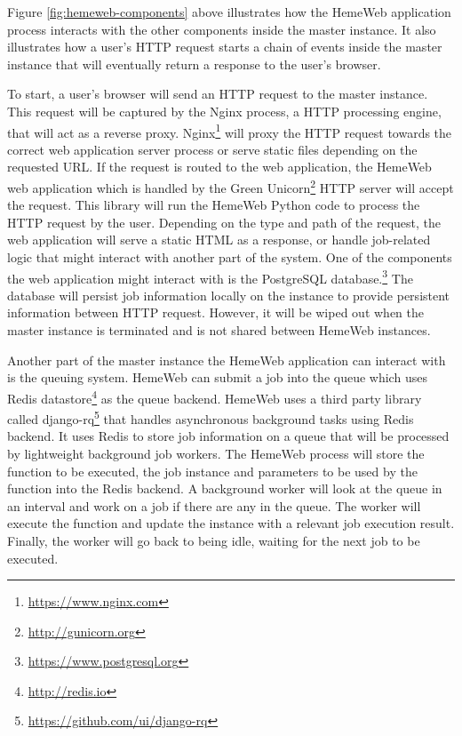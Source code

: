 \vspace{1cm}

Figure \ref{fig:hemeweb-components} above illustrates how the HemeWeb application process interacts with the other components inside the master instance. It also illustrates how a user's HTTP request starts a chain of events inside the master instance that will eventually return a response to the user's browser.

To start, a user's browser will send an HTTP request to the master instance. This request will be captured by the Nginx process, a HTTP processing engine, that will act as a reverse proxy.  Nginx\footnote{\url{https://www.nginx.com}} will proxy the HTTP request towards the correct web application server process or serve static files depending on the requested URL. If the request is routed to the web application, the HemeWeb web application which is handled by the Green Unicorn\footnote{\url{http://gunicorn.org}} HTTP server will accept the request. This library will run the HemeWeb Python code to process the HTTP request by the user. Depending on the type and path of the request, the web application will serve a static HTML as a response, or handle job-related logic that might interact with another part of the system. One of the components the web application might interact with is the PostgreSQL database.\footnote{\url{https://www.postgresql.org}} The database will persist job information locally on the instance to provide persistent information between HTTP request. However, it will be wiped out when the master instance is terminated and is not shared between HemeWeb instances.

Another part of the master instance the HemeWeb application can interact with is the queuing system. HemeWeb can submit a job into the queue which uses Redis datastore\footnote{\url{http://redis.io}} as the queue backend. HemeWeb uses a third party library called django-rq\footnote{\url{https://github.com/ui/django-rq}} that handles asynchronous background tasks using Redis backend. It uses Redis to store job information on a queue that will be processed by lightweight background job workers. The HemeWeb process will store the function to be executed, the job instance and parameters to be used by the function into the Redis backend. A background worker will look at the queue in an interval and work on a job if there are any in the queue. The worker will execute the function and update the instance with a relevant job execution result. Finally, the worker will go back to being idle, waiting for the next job to be executed.


